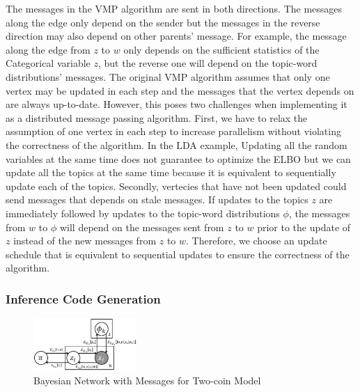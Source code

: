 The messages in the VMP algorithm are sent in both directions. The messages
along the edge only depend on the sender but the messages in the reverse
direction may also depend on other parents' message.  For example, the message
along the edge from $z$ to $w$ only depends on the sufficient statistics of
the Categorical variable $z$, but the reverse one will depend on the
topic-word distributions' messages. The original VMP algorithm assumes that
only one vertex may be updated in each step and the messages that the vertex
depends on are always up-to-date.  However, this poses two challenges when
implementing it as a distributed message passing algorithm. First, we have to
relax the assumption of one vertex in each step to increase parallelism
without violating the correctness of the algorithm. In the LDA example,
Updating all the random variables at the same time does not guarantee to
optimize the ELBO but we can update all the topics at the same time because it
is equivalent to sequentially update each of the topics. Secondly, vertecies
that have not been updated could send messages that depends on stale messages.
If updates to the topics $z$ are immediately followed by updates to the
topic-word distributions $\phi$, the messages from $w$ to $\phi$ will depend
on the messages sent from $z$ to $w$ prior to the update of $z$ instead of the
new messages from $z$ to $w$. Therefore, we choose an update schedule that is
equivalent to sequential updates to ensure the correctness of the algorithm.


\subsubsection{Inference Code Generation}

\begin{figure}
\centering
	\includegraphics[width=0.35\textwidth]{figs/two_coins_msg.eps}
	\caption{Bayesian Network with Messages for Two-coin Model}
	\label{fig:two_coins_msg}
\end{figure}

%



